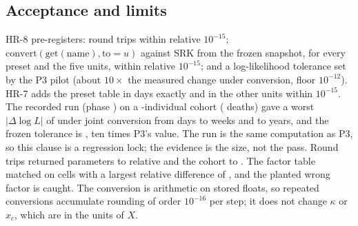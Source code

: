 \subsection{Acceptance and limits}\label{sec:units-accept}

HR-8 pre-registers: round trips within relative $10^{-15}$; $\mathrm{convert}(\mathrm{get}(\text{name}),\text{to}=u)$
against SRK  from the frozen snapshot, for every preset and the five units, within
relative $10^{-15}$; and a log-likelihood tolerance set by the P3 pilot (about $10\times$ the measured change under
conversion, floor $10^{-12}$). HR-7 adds the preset table in days exactly and in the other units within $10^{-15}$.
The recorded run (phase ) on a -individual cohort ( deaths) gave a worst $|\Delta\log L|$ of  under joint
conversion from days to weeks and to years, and the frozen tolerance is , ten times P3's value. The run is the same
computation as P3, so this clause is a regression lock; the evidence is the size, not the pass. Round trips returned parameters to relative  and the cohort to .
The factor table matched  on  cells with a largest relative difference of , and the planted wrong factor is caught.
The conversion is arithmetic on stored floats, so repeated conversions accumulate rounding of order $10^{-16}$ per
step; it does not change $\kappa$ or $x_c$, which are in the units of $X$.
